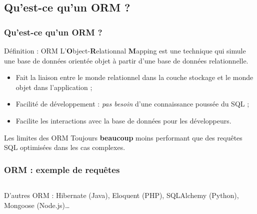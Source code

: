     \subsection{Qu'est-ce qu'un ORM ?}
    \begin{frame}
        \frametitle{Qu'est-ce qu'un ORM ?}

        \begin{block}{Définition : ORM}
            L'\textbf{O}bject-\textbf{R}elationnal \textbf{M}apping est une technique qui simule une base de données orientée objet à partir d'une base de données relationnelle.
        \end{block}

        \begin{itemize}
            \footnotesize
            \item Fait la liaison entre le monde relationnel dans la couche stockage et le monde objet dans l'application ;
            \item Facilité de développement : \textit{pas besoin} d'une connaissance poussée du SQL ;
            \item Facilite les interactions avec la base de données pour les développeurs.
        \end{itemize}

        \begin{alertblock}{Les limites des ORM}
            Toujours \textbf{beaucoup} moins performant que des requêtes SQL optimisées dans les cas complexes.
        \end{alertblock}
    \end{frame}

    \begin{frame}
        \frametitle{ORM : exemple de requêtes}

        \begin{listing}[H]
            \inputminted[fontsize=\tiny, linenos=true]{java}{code/eloquent.java}
            \caption{Quelques requêtes basiques avec un ORM imaginaire.}
        \end{listing}

        \scriptsize{D'autres ORM : Hibernate (Java), Eloquent (PHP), SQLAlchemy (Python), Mongoose (Node.js)\dots}
    \end{frame}
